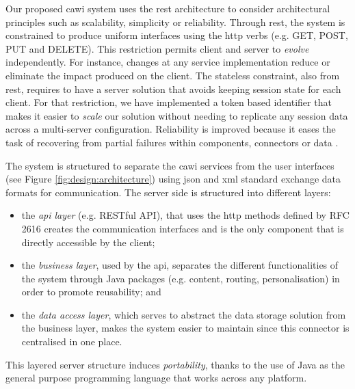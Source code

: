 	Our proposed \gls{cawi} system uses the \gls{rest} architecture \cite{phdthesis:fielding00} to consider architectural principles such as scalability, simplicity or reliability. Through \gls{rest}, the system is constrained to produce uniform interfaces using the \gls{http} verbs (e.g. GET, POST, PUT and DELETE). This restriction permits client and server to \emph{evolve} independently. For instance, changes at any service implementation reduce or eliminate the impact produced on the client. The stateless constraint, also from \gls{rest}, requires to have a server solution that avoids keeping session state for each client. For that restriction, we have implemented a token based identifier that makes it easier to \emph{scale} our solution without needing to replicate any session data across a multi-server configuration. Reliability is improved because it eases the task of recovering from partial failures within components, connectors or data \cite{phdthesis:fielding00}.

	The system is structured to separate the \gls{cawi} services from the user interfaces (see Figure \ref{fig:design:architecture}) using \gls{json} and \gls{xml} standard exchange data formats for communication. 
	The server side is structured into different layers: 
	\begin{itemize}
		\item the \emph{\gls{api} layer} (e.g. RESTful API), that uses the \gls{http} methods defined by RFC 2616 \cite{web:fielding99} creates the communication interfaces and is the only component that is directly accessible by the client;
		\item the \emph{business layer}, used by the \gls{api}, separates the different functionalities of the system through Java packages (e.g. content, routing, personalisation) in order to promote reusability; and
		\item the \emph{data access layer}, which serves to abstract the data storage solution from the business layer, makes the system easier to maintain since this connector is centralised in one place.
	\end{itemize}

	This layered server structure induces \emph{portability}, thanks to the use of Java as the general purpose programming language that works across any platform.

